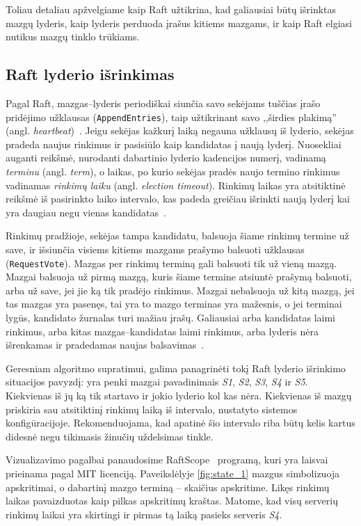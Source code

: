 \documentclass{VUMIFPSkursinis}
\begin{document}
Toliau detaliau apžvelgiame kaip Raft užtikrina, kad galiausiai būtų išrinktas mazgų lyderis, kaip lyderis perduoda įrašus kitiems mazgams, ir kaip Raft elgiasi nutikus mazgų tinklo trūkiams.

\subsection{Raft lyderio išrinkimas}

Pagal Raft, mazgas--lyderis periodiškai siunčia savo sekėjams tuščias įrašo pridėjimo užklausas (\texttt{AppendEntries}), taip užtikrinant savo ,,širdies plakimą'' (angl. \textit{heartbeat})~\cite{ongaro_consensus}. Jeigu sekėjas kažkurį laiką negauna užklausų iš lyderio, sekėjas pradeda naujus rinkimus ir pasisiūlo kaip kandidatas į naują lyderį. Nuosekliai auganti reikšmė, nurodanti dabartinio lyderio kadencijos numerį, vadinamą \textit{terminu} (angl. \emph{term}), o laikas, po kurio sekėjas pradės naujo termino rinkimus vadinamas \textit{rinkimų laiku} (angl. \textit{election timeout}). Rinkimų laikas yra atsitiktinė reikšmė iš pasirinkto laiko intervalo, kas padeda greičiau išrinkti naują lyderį kai yra daugiau negu vienas kandidatas~\cite{ongaro_consensus}.

Rinkimų pradžioje, sekėjas tampa kandidatu, balsuoja šiame rinkimų termine už save, ir išsiunčia visiems kitiems mazgams prašymo balsuoti užklausas (\texttt{RequestVote}). Mazgas per rinkimų terminą gali balsuoti tik už vieną mazgą. Mazgai balsuoja už pirmą mazgą, kuris šiame termine atsiuntė prašymą balsuoti, arba už save, jei jie ką tik pradėjo rinkimus. Mazgai nebalsuoja už kitą mazgą, jei tas mazgas yra pasenęs, tai yra to mazgo terminas yra mažesnis, o jei terminai lygūs, kandidato žurnalas turi mažiau įrašų. Galiausiai arba kandidatas laimi rinkimus, arba kitas mazgas--kandidatas laimi rinkimus, arba lyderis nėra išrenkamas ir pradedamas naujas balsavimas~\cite{ongaro_consensus}.

Geresniam algoritmo supratimui, galima panagrinėti tokį Raft lyderio išrinkimo situacijos pavyzdį: yra penki mazgai pavadinimais \textit{S1}, \textit{S2}, \textit{S3}, \textit{S4} ir \textit{S5}. Kiekvienas iš jų ką tik startavo ir jokio lyderio kol kas nėra. Kiekvienas iš mazgų priskiria sau atsitiktinį rinkimų laiką iš intervalo, nustatyto sistemos konfigūracijoje. Rekomenduojama, kad apatinė šio intervalo riba būtų kelis kartus didesnė negu tikimasis žinučių uždelsimas tinkle. 

Vizualizavimo pagalbai panaudosime RaftScope~\cite{ongaro_raftscope_2020} programą, kuri yra laisvai prieinama pagal MIT licenciją. Paveikslėlyje \ref{fig:state_1} mazgus simbolizuoja apskritimai, o dabartinį mazgo terminą -- skaičius apskritime. Likęs rinkimų laikas pavaizduotas kaip pilkas apskritimų kraštas. Matome, kad visų serverių rinkimų laikai yra skirtingi ir pirmas tą laiką pasieks serveris \textit{S4}.
\end{document}
